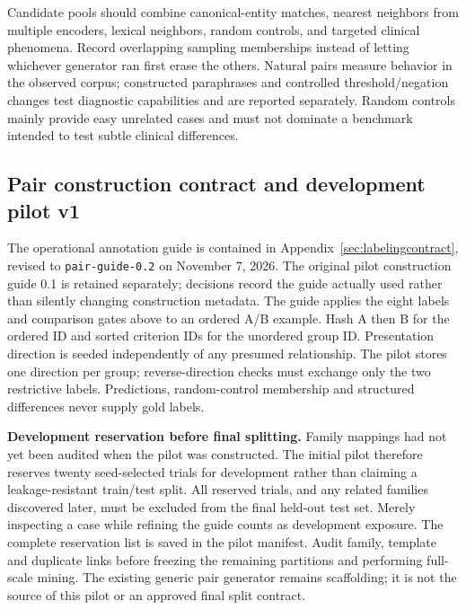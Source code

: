\documentclass[10pt,letterpaper]{article}
\newcommand{\pathcode}[1]{\nolinkurl{#1}}
\begin{document}
Candidate pools should combine canonical-entity matches, nearest neighbors
from multiple encoders, lexical neighbors, random controls, and targeted
clinical phenomena. Record overlapping sampling memberships instead of
letting whichever generator ran first erase the others. Natural pairs measure
behavior in the observed corpus; constructed paraphrases and controlled
threshold/negation changes test diagnostic capabilities and are reported
separately. Random controls mainly provide easy unrelated cases and must not
dominate a benchmark intended to test subtle clinical differences.

\subsection{Pair construction contract and development pilot v1}
\label{sec:pairpilot}
The operational annotation guide is contained in Appendix~\ref{sec:labelingcontract},
revised to \pathcode{pair-guide-0.2} on November 7, 2026. The original pilot
construction guide 0.1 is retained separately; decisions record the guide
actually used rather than silently changing construction metadata.
The guide applies the eight labels and comparison
gates above to an ordered A/B example. Hash A then B for the ordered ID and
sorted criterion IDs for the unordered group ID. Presentation direction is
seeded independently of any presumed relationship. The pilot stores one
direction per group; reverse-direction checks must exchange only the two
restrictive labels. Predictions, random-control membership and structured
differences never supply gold labels.

\textbf{Development reservation before final splitting.} Family mappings
had not yet been audited when the pilot was constructed. The initial pilot therefore reserves twenty
seed-selected trials for development rather than claiming a leakage-resistant
train/test split. All reserved trials, and any related families discovered
later, must be excluded from the final held-out test set. Merely inspecting
a case while refining the guide counts as development exposure. The complete
reservation list is saved in the pilot manifest. Audit family, template and
duplicate links before freezing the remaining partitions and performing
full-scale mining. The existing generic pair generator remains scaffolding;
it is not the source of this pilot or an approved final split contract.
\end{document}
